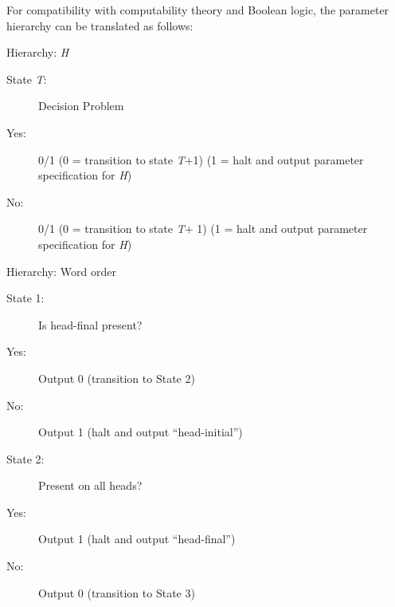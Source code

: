 \documentclass[output=paper]{langsci/langscibook}
\begin{document}
\begin{figure}


\end{figure}

For compatibility with computability theory and Boolean logic, the parameter
hierarchy can be translated as follows:

\ea Hierarchy: \emph{H}
\begin{description}
\item[State \emph{T}:] Decision Problem
\item[Yes:] 0/1 (0 = transition to state \emph{T}+1) (1 = halt and output parameter specification for \emph{H})
\item[No:] 0/1 (0 = transition to state \emph{T}+ 1) (1 = halt and output parameter specification for \emph{H})
\end{description}
\ex
Hierarchy: Word order
 \begin{description}
\item[State 1:] Is head-final present?
\item[Yes:] Output 0 (transition to State 2)
\item[No:] Output 1 (halt and output “head-initial”)
 \end{description}
 
 \begin{description}
\item[State 2:] Present on all heads?
\item[Yes:] Output 1 (halt and output “head-final”)
\item[No:] Output 0 (transition to State 3)
 \end{description}
 
\end{document}
